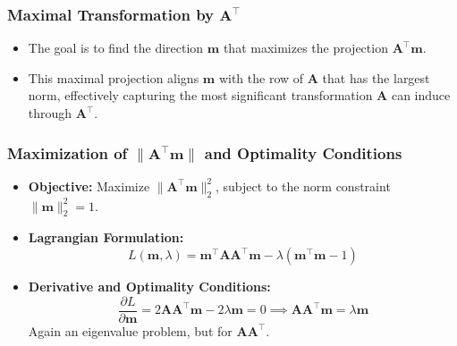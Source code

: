 \documentclass[aspectratio=169]{beamer}
\begin{document}
\begin{frame}
\frametitle{Maximal Transformation by \( \mathbf{A}^\top \)}
\begin{itemize}
    \item The goal is to find the direction \( \mathbf{m} \) that maximizes the projection \( \mathbf{A}^\top \mathbf{m} \).
    \item This maximal projection aligns \( \mathbf{m} \) with the row of \( \mathbf{A} \) that has the largest norm, effectively capturing the most significant transformation \( \mathbf{A} \) can induce through \( \mathbf{A}^\top \).
\end{itemize}
\end{frame}

\begin{frame}
\frametitle{Maximization of \( \| \mathbf{A}^\top \mathbf{m} \| \) and Optimality Conditions}

\begin{itemize}
  \item \textbf{Objective:} Maximize \( \| \mathbf{A}^\top \mathbf{m} \|_2^2 \), subject to the norm constraint \( \|\mathbf{m}\|_2^2 = 1 \).

  \item \textbf{Lagrangian Formulation:}
  \[
  L(\mathbf{m}, \lambda) = \mathbf{m}^\top \mathbf{A} \mathbf{A}^\top \mathbf{m} - \lambda (\mathbf{m}^\top \mathbf{m} - 1)
  \]
  \pause

  \item \textbf{Derivative and Optimality Conditions:}
  \[
  \frac{\partial L}{\partial \mathbf{m}} = 2 \mathbf{A} \mathbf{A}^\top \mathbf{m} - 2 \lambda \mathbf{m} = 0 \implies \mathbf{A} \mathbf{A}^\top \mathbf{m} = \lambda \mathbf{m}
  \]
  Again an eigenvalue problem, but for \( \mathbf{A} \mathbf{A}^\top \).
\end{itemize}

\end{frame}
\end{document}
